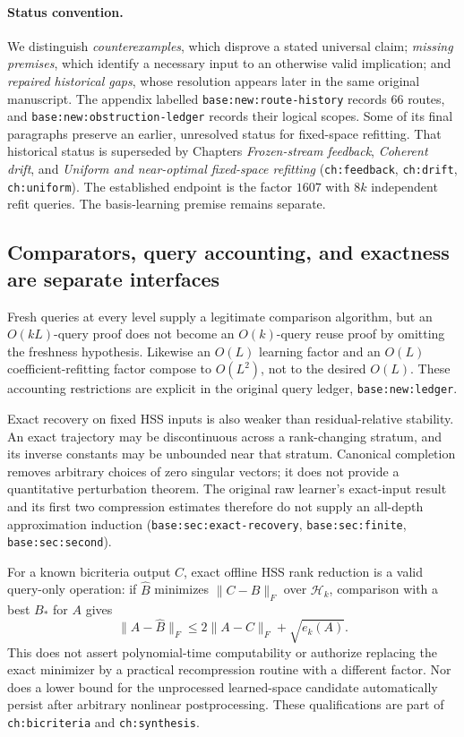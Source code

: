 \documentclass[11pt,oneside,openany,a4paper]{report}
\numberwithin{equation}{chapter}
\theoremstyle{definition}
\theoremstyle{remark}
\begin{document}
\paragraph{Status convention.}
We distinguish \emph{counterexamples}, which disprove a stated universal
claim; \emph{missing premises}, which identify a necessary input to an
otherwise valid implication; and \emph{repaired historical gaps}, whose
resolution appears later in the same original manuscript.  The appendix
labelled \texttt{base:new:route-history} records 66 routes, and
\texttt{base:new:obstruction-ledger} records their logical scopes.
Some of its final paragraphs preserve an earlier, unresolved status for
fixed-space refitting.  That historical status is superseded by Chapters
\emph{Frozen-stream feedback}, \emph{Coherent drift}, and
\emph{Uniform and near-optimal fixed-space refitting}
(\texttt{ch:feedback}, \texttt{ch:drift}, \texttt{ch:uniform}).
The established endpoint is the factor $1607$ with $8k$ independent
refit queries.  The basis-learning premise remains separate.

\subsection{Comparators, query accounting, and exactness are separate interfaces}
\label{origobs:interfaces}

Fresh queries at every level supply a legitimate comparison algorithm,
but an $O(kL)$-query proof does not become an $O(k)$-query reuse proof by
omitting the freshness hypothesis.  Likewise an $O(L)$ learning factor
and an $O(L)$ coefficient-refitting factor compose to $O(L^2)$, not to
the desired $O(L)$.  These accounting restrictions are explicit in the
original query ledger, \texttt{base:new:ledger}.

Exact recovery on fixed HSS inputs is also weaker than residual-relative
stability.  An exact trajectory may be discontinuous across a
rank-changing stratum, and its inverse constants may be unbounded near
that stratum.  Canonical completion removes arbitrary choices of zero
singular vectors; it does not provide a quantitative perturbation
theorem.  The original raw learner's exact-input result and its first
two compression estimates therefore do not supply an all-depth
approximation induction (\texttt{base:sec:exact-recovery},
\texttt{base:sec:finite}, \texttt{base:sec:second}).

For a known bicriteria output $C$, exact offline HSS rank reduction is a
valid query-only operation: if $\widehat B$ minimizes
$\|C-B\|_F$ over $\mathcal H_k$, comparison with a best $B_*$ for $A$
gives
\[
 \|A-\widehat B\|_F\le2\|A-C\|_F+\sqrt{e_k(A)}.
\]
This does not assert polynomial-time computability or authorize replacing
the exact minimizer by a practical recompression routine with a different
factor.  Nor does a lower bound for the unprocessed learned-space
candidate automatically persist after arbitrary nonlinear postprocessing.
These qualifications are part of \texttt{ch:bicriteria} and
\texttt{ch:synthesis}.
\end{document}
